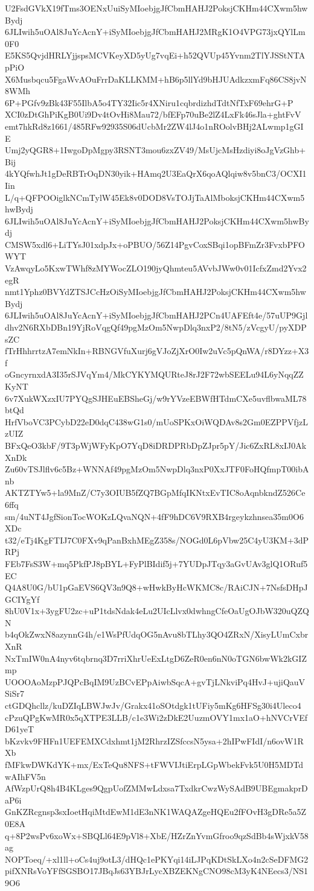U2FsdGVkX19fTms3OENxUuiSyMIoebjgJfCbmHAHJ2PoksjCKHm44CXwm5hwBydj
6JLIwih5uOAl8JuYcAcnY+iSyMIoebjgJfCbmHAHJ2MRgK1O4VPG73jxQYlLm0F0
E5KS5QvjdHRLYjjspsMCVKeyXD5yUg7vqEi+h52QVUp45Yvnm2TlYJSStNTApPiO
X6Musbqcu5FgaWvAOuFrrDaKLLKMM+hB6p5llYd9bHJUAdkzxmFq86CS8jvN8WMh
6P+PGfv9zBk43F55IlbA5o4TY32Iic5r4XNiru1cqbrdizhdTdtNfTxF69ehrG+P
XCI0zDtGhPiKgB0Ui9Dv4tOvHi8Mau72/bfEFp70uBe2lZ4LxFk46sJla+ghtFvV
emt7hkRd8z1661/485RFw92935S06dUcbMr2ZW4lJ4o1nROolvBHj2ALwmp1gGIE
Umj2yQGR8+1IwgoDpMgpy3RSNT3mou6zxZV49/MsUjcMsHzdiyi8oJgVzGhb+Bij
4kYQfwhJt1gDeRBTrOqDN30yik+HAmq2U3EaQrX6qoAQlqiw8v5bnC3/OCXI1Iin
L/q+QFPOOiglkNCmTylW45Ek8v0DOD8VsTOJjTaAlMboksjCKHm44CXwm5hwBydj
6JLIwih5uOAl8JuYcAcnY+iSyMIoebjgJfCbmHAHJ2PoksjCKHm44CXwm5hwBydj
CMSW5xdl6+LiTYsJ01xdpJx+oPBUO/56Z14PgvCoxSBqi1opBFmZr3FvxbPFOWYT
VzAwqyLo5KxwTWhf8zMYWocZLO190jyQhmteu5AVvbJWw0v01IcfxZmd2Yvx2egR
nmt1Yphz0BVYdZTSJCcHzOiSyMIoebjgJfCbmHAHJ2PoksjCKHm44CXwm5hwBydj
6JLIwih5uOAl8JuYcAcnY+iSyMIoebjgJfCbmHAHJ2PCn4UAFEft4e/57uUP9Gjl
dhv2N6RXbDBn19YjRoVqgQf49pgMzOm5NwpDlq3nxP2/8tN5/zVcgyU/pyXDPsZC
fTrHhhrrtzA7emNkIn+RBNGVfuXurj6gVJoZjXrO0Iw2uVc5pQnWA/r8DYzz+X3f
oGncyrnxdA3I35rSJVqYm4/MkCYKYMQURteJ8rJ2F72wbSEELu94L6yNqqZZKyNT
6v7XukWXzxIU7PYQgSJHEuEBSheGj/w9rYVzeEBWfHTdmCXe5uvflbwaML78btQd
HrfVboVC3PCybD22eD0dqC438wG1s0/mUoSPKxOiWQDAv8s2Gm0EZPPVfjzLzUIZ
BFxQeO3kbF/9T3pWjWFyKpO7YqD8iDRDPRbDpZJpr5pY/Jic6ZxRL8xIJ0AkXnDk
Zu60vTSJlflv6c5Bz+WNNAf49pgMzOm5NwpDlq3nxP0XxJTF0FoHQfmpT00ibAnb
AKTZTYw5+la9MnZ/C7y3OIUB5fZQ7BGpMfqIKNtxEvTIC8oAqnbkndZ526Ce6ffq
sm/4uNT4JgfSionTocWOKzLQvaNQN+4fF9hDC6V9RXB4rgeykzhnsea35m0O6XDc
t32/eTj4KgFTIJ7C0FXv9qPanBxhMEgZ358s/NOGd0L6pVbw25C4yU3KM+3dPRPj
FEb7FsS3W+mq5PkfPJ8pBYL+FyPlBIdif5j+7YUDpJTqy3aGvUAv3glQ1ORuf5EC
Q4A8U0G/bU1pGaEVS6QV3n9Q8+wHwkByHcWKMC8c/RAiCJN+7NsfsDHpJGCIYgYf
8hU0V1x+3ygFU2zc+uP1tdsNdak4eLu2UIcLlvx0dwhngCfeOaUgOJbW320uQZQN
b4qOkZwxN8azynnG4h/e1WsPfUdqOG5nAvu8bTLhy3QO4ZRxN/XisyLUmCxbrXnR
NxTmIW0nA4nyv6tqbrnq3D7rriXhrUeExLtgD6ZeR0en6nN0oTGN6bwWk2kGIZmp
UOOOAoMzpPJQPcBqIM9UzBCvEPpAiwbSqcA+gvTjLNkviPq4HvJ+ujiQauVSiSr7
ctGDQhcllz/kuDZIqLBWJwJv/Grakx41oSOtdgk1tUFiy5mKg6HFSg30i4Uleco4
cPzuQPgKwMR0x5qXTPE3LLB/c1e3Wi2zDkE2UuzmOVY1mx1aO+hNVCrVEfD61yeT
bKzvkv9FHFn1UEFEMXCdxhmt1jM2RhrzIZSfccsN5ysa+2hIPwFIdI/n6ovW1RXb
fMFkwDWKdYK+mx/ExTeQu8NFS+tFWVIJtiErpLGpWbekFvk5U0H5MDTdwAIhFV5n
AfWzpUrQ8h4B4KLges9QgpUofZMMwLdxsa7TxdkrCwzWySAdB9UBEgmakprDaP6i
GnKZRcgnsp3sxIoetHqiMtdEwM1dE3nNK1WAQAZgeHQEu2fFOvH3gDRe5a5Z0E8A
q+8P2wsPv6xoWx+SBQLl64E9pVl8+XbE/HZrZnYvmGfroo9qzSdBb4sWjxkV58ag
NOPToeq/+xl1ll+oCs4uj9otL3/dHQc1ePKYqi14iLJPqKDtSkLXo4n2cSeDFMG2
pifXNRsVoYFfSGSBO17JBqJs63YBJrLycXBZEKNgCNO98cM3yK4NEecs3/NS19O6
